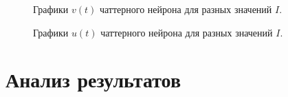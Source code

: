 \begin{figure}[h]
	\caption{Графики $v(t)$ чаттерного нейрона для разных значений $I$.}
	\label{ch_different_I_potentials}
\end{figure}

\begin{figure}[h]
	\caption{Графики $u(t)$ чаттерного нейрона для разных значений $I$.}
	\label{ch_different_I_recovery}
\end{figure}


\section{Анализ результатов}

